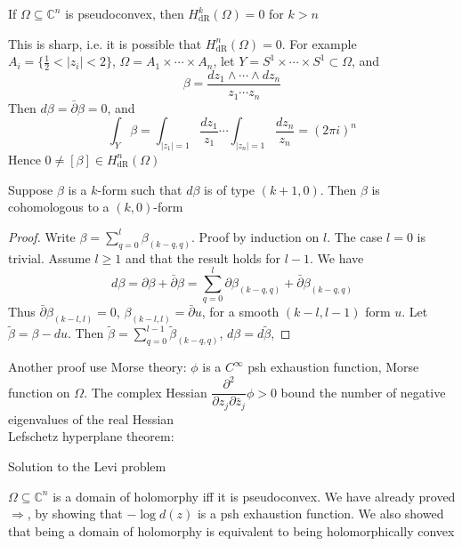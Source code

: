 \documentclass[../main.tex]{subfiles}
\begin{document}
\begin{theorem}
If $\Omega\subseteq\mathbb C^{n}$ is pseudoconvex, then $H^k_{\mathrm{dR}}(\Omega)=0$ for $k>n$
\end{theorem}

\begin{remark}
This is sharp, i.e. it is possible that $H^n_{\mathrm{dR}}(\Omega)=0$. For example $A_i=\{\frac{1}{2}<|z_i|<2\}$, $\Omega=A_1\times\cdots\times A_n$, let $Y=S^1\times\cdots\times S^1\subset\Omega$, and
\[\beta=\frac{dz_1\wedge\cdots\wedge dz_n}{z_1\cdots z_n}\]
Then $d\beta=\bar\partial\beta=0$, and
\[\int_Y\beta=\int_{|z_1|=1}\frac{dz_1}{z_1}\cdots\int_{|z_n|=1}\frac{dz_n}{z_n}=(2\pi i)^n\]
Hence $0\neq[\beta]\in H^n_{\mathrm{dR}}(\Omega)$
\end{remark}

\begin{claim}
Suppose $\beta$ is a $k$-form such that $d\beta$ is of type $(k+1,0)$. Then $\beta$ is cohomologous to a $(k,0)$-form
\end{claim}

\begin{proof}
Write $\beta=\sum_{q=0}^l\beta_{(k-q,q)}$. Proof by induction on $l$. The case $l=0$ is trivial. Assume $l\geq1$ and that the result holds for $l-1$. We have
\[d\beta=\partial\beta+\bar\partial\beta=\sum_{q=0}^l\partial\beta_{(k-q,q)}+\bar\partial\beta_{(k-q,q)}\]
Thus $\bar\partial\beta_{(k-l,l)}=0$, $\beta_{(k-l,l)}=\bar\partial u$, for a smooth $(k-l,l-1)$ form $u$. Let $\tilde\beta=\beta-du$. Then $\tilde\beta=\sum_{q=0}^{l-1}\tilde\beta_{(k-q,q)}$, $d\beta=d\tilde\beta$,
\end{proof}

\begin{remark}
Another proof use Morse theory: $\phi$ is a $C^\infty$ psh exhaustion function, Morse function on $\Omega$. The complex Hessian $\dfrac{\partial^2}{\partial z_j\partial\bar z_j}\phi>0$ bound the number of negative eigenvalues of the real Hessian \\
Lefschetz hyperplane theorem: 
\end{remark}

Solution to the Levi problem

\begin{theorem}
$\Omega\subseteq\mathbb C^n$ is a domain of holomorphy iff it is pseudoconvex. We have already proved $\Rightarrow$, by showing that $-\log d(z)$ is a psh exhaustion function. We also showed that being a domain of holomorphy is equivalent to being holomorphically convex
\end{theorem}
\end{document}
